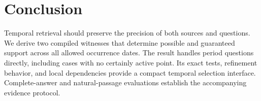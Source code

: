 \section{Conclusion}
Temporal retrieval should preserve the precision of both sources and questions.
We derive two compiled witnesses that determine possible and guaranteed support across all allowed occurrence dates.
The result handles period questions directly, including cases with no certainly active point.
Its exact tests, refinement behavior, and local dependencies provide a compact temporal selection interface.
Complete-answer and natural-passage evaluations establish the accompanying evidence protocol.
